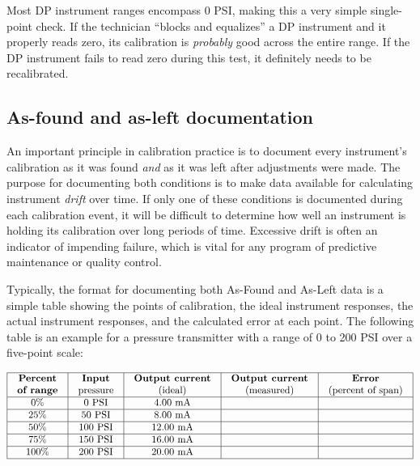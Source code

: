 Most DP instrument ranges encompass 0 PSI, making this a very simple single-point check.  If the technician ``blocks and equalizes'' a DP instrument and it properly reads zero, its calibration is \textit{probably} good across the entire range.  If the DP instrument fails to read zero during this test, it definitely needs to be recalibrated.












\filbreak
\subsection{As-found and as-left documentation}

An important principle in calibration practice is to document every instrument's calibration as it was found \textit{and} as it was left after adjustments were made.  The purpose for documenting both conditions is to make data available for calculating instrument \textit{drift} over time.  If only one of these conditions is documented during each calibration event, it will be difficult to determine how well an instrument is holding its calibration over long periods of time.  Excessive drift is often an indicator of impending failure, which is vital for any program of predictive maintenance or quality control.        

Typically, the format for documenting both As-Found and As-Left data is a simple table showing the points of calibration, the ideal instrument responses, the actual instrument responses, and the calculated error at each point.  The following table is an example for a pressure transmitter with a range of 0 to 200 PSI over a five-point scale:


$$\vbox{\offinterlineskip
\halign{\strut
\vrule \quad\hfil # \ \hfil & 
\vrule \quad\hfil # \ \hfil & 
\vrule \quad\hfil # \ \hfil & 
\vrule \quad\hfil # \ \hfil & 
\vrule \quad\hfil # \ \hfil \vrule \cr
\noalign{\hrule}
%
\textbf{Percent} & \textbf{Input} & \textbf{Output current} & \textbf{Output current} & \textbf{Error} \cr
%
\textbf{of range} & pressure & (ideal) & (measured) & (percent of span) \cr
%
\noalign{\hrule}
%
0\% & 0 PSI & 4.00 mA &  & \cr
%
\noalign{\hrule}
%
25\% & 50 PSI & 8.00 mA &  & \cr
%
\noalign{\hrule}
%
50\% & 100 PSI & 12.00 mA &  & \cr
%
\noalign{\hrule}
%
75\% & 150 PSI & 16.00 mA &  & \cr
%
\noalign{\hrule}
%
100\% & 200 PSI & 20.00 mA &  & \cr
%
\noalign{\hrule}
} %
}$$ %

